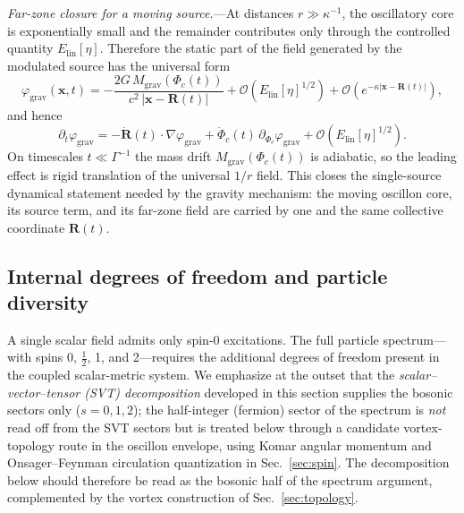 \documentclass[aps,prd,onecolumn,superscriptaddress,nofootinbib,showpacs,12pt,notitlepage]{revtex4-2}
\renewcommand{\order}[1]{\mathcal{O}\!\left(#1\right)}
\begin{document}
\textit{Far-zone closure for a moving source.}---At distances
$r \gg \kappa^{-1}$, the oscillatory core is exponentially small and
the remainder contributes only through the controlled quantity
$E_{\mathrm{lin}}[\eta]$.  Therefore the static part of the field
generated by the modulated source has the universal form
\begin{equation}\label{eq:moving_source_far_zone}
  \varphi_{\mathrm{grav}}(\mathbf{x},t)
  = -\frac{2G\,M_{\mathrm{grav}}(\Phi_c(t))}
      {c^2\,|\mathbf{x}-\mathbf{R}(t)|}
    + \order{E_{\mathrm{lin}}[\eta]^{1/2}}
    + \order{e^{-\kappa |\mathbf{x}-\mathbf{R}(t)|}},
\end{equation}
and hence
\begin{equation}\label{eq:moving_source_time_derivative}
  \partial_t\varphi_{\mathrm{grav}}
  = -\dot{\mathbf{R}}(t)\!\cdot\!\nabla\varphi_{\mathrm{grav}}
    + \dot{\Phi}_c(t)\,\partial_{\Phi_c}\varphi_{\mathrm{grav}}
    + \order{E_{\mathrm{lin}}[\eta]^{1/2}}.
\end{equation}
On timescales $t \ll \Gamma^{-1}$ the mass drift
$M_{\mathrm{grav}}(\Phi_c(t))$ is adiabatic, so the leading effect is
rigid translation of the universal $1/r$ field.  This closes the
single-source dynamical statement needed by the gravity mechanism:
the moving oscillon core, its source term, and its far-zone field are
carried by one and the same collective coordinate $\mathbf{R}(t)$.

\subsection{Internal degrees of freedom and particle diversity}
\label{sec:internal_dof}

A single scalar field admits only spin-0 excitations.
The full particle spectrum---with spins 0, $\frac{1}{2}$,
1, and 2---requires the additional degrees of freedom
present in the coupled scalar-metric system.  We emphasize
at the outset that the \emph{scalar--vector--tensor (SVT)
decomposition} developed in this section supplies the
bosonic sectors only ($s=0,1,2$); the half-integer
(fermion) sector of the spectrum is \emph{not} read off
from the SVT sectors but is treated below through a
candidate vortex-topology route in the oscillon envelope,
using Komar angular momentum and Onsager--Feynman
circulation quantization
in Sec.~\ref{sec:spin}.  The decomposition below should
therefore be read as the bosonic half of the spectrum
argument, complemented by the vortex construction of
Sec.~\ref{sec:topology}.
\end{document}
